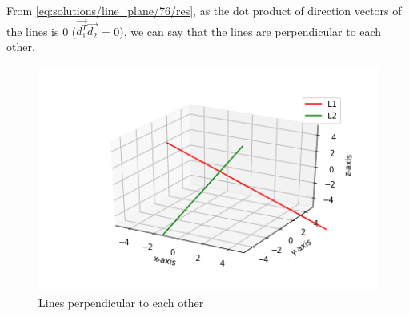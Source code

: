 From \eqref{eq:solutions/line_plane/76/res}, as the dot product of direction vectors of the lines is 0 ($\vec{d_1^T}\vec{d_2}$ = 0), we can say that the lines are perpendicular to each other.

\renewcommand{\thefigure}{\arabic{figure}}
\begin{figure}[h!]
	\centering
	\includegraphics[width=\columnwidth]{./solutions/line_plane/76/lines.png}
	\caption{Lines perpendicular to each other}
	\label{myfig:solutions/line_plane/76/}
\end{figure}
